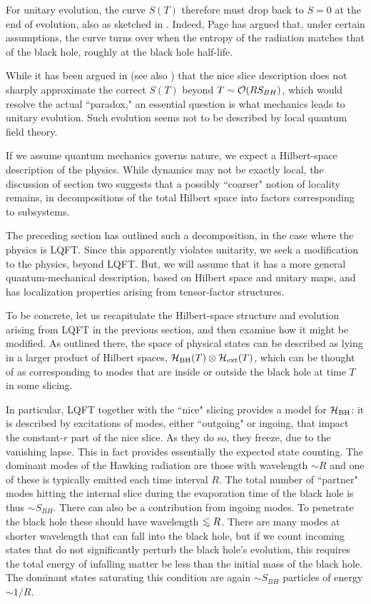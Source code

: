 For unitary evolution, the curve $S(T)$ therefore must drop back to $S=0$ at the end of evolution, also as sketched in \entropfig.  Indeed, Page has argued that, under certain assumptions, the curve turns over when the entropy of the radiation matches that of the black hole, roughly at the black hole half-life.

While it has been argued in  (see also \GiddingsSJ) that the nice slice description does not sharply approximate the correct $S(T)$ beyond $T\sim {\cal O}(R S_{BH})$, which would resolve the actual ``paradox," an essential question is what mechanics leads to unitary evolution.  Such evolution seems not to be described by local quantum field theory.

If we assume quantum mechanics governs nature, we expect a Hilbert-space description of the physics.  While dynamics may not be exactly local, the discussion of section two suggests that a possibly ``coarser" notion of locality remains, in decompositions of the total Hilbert space into factors corresponding to subsystems.

The preceding section has outlined such a decomposition, in the case where the physics is LQFT.  Since this apparently violates unitarity, we seek a modification to the physics, beyond LQFT.  But, we will assume that it has a more general quantum-mechanical description, based on Hilbert space and unitary maps, and has localization properties arising from tensor-factor structures.

To be concrete, let us recapitulate  the Hilbert-space structure and evolution arising from LQFT in the previous section, and then examine how it might be modified.  As outlined there, the space of physical states can be described as lying in a larger product of Hilbert spaces, $ {{\cal H}_{\rm BH}}(T)\otimes{{\cal H}_{\rm ext}}(T)$, which can be thought of as corresponding to modes that are inside or outside the black hole at time $T$ in some slicing.  


In particular, LQFT together with the ``nice" slicing provides a model for ${{\cal H}_{\rm BH}}$: it is described by excitations of modes, either ``outgoing" or ingoing, that impact the constant-$r$ part of the nice slice.  As they do so, they freeze, due to the vanishing lapse.  This in fact provides essentially the expected state counting.  The dominant modes of the Hawking radiation are those with wavelength $\sim R$ and one of these is typically emitted each time interval  $R$.  The total number of ``partner" modes hitting the internal slice during the evaporation time of the black hole is thus $\sim S_{BH}$.  There can also be a contribution from ingoing modes.  To penetrate the black hole these should have wavelength $\roughly< R$.  There are many modes at shorter wavelength that can fall into the black hole, but if we count incoming states that do not significantly perturb the black hole's evolution, this requires the total energy of infalling matter be less than the initial mass of the black hole.  The dominant states saturating this condition are again $\sim S_{BH}$ particles of energy $\sim 1/R$.  

